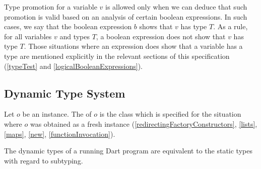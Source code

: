 \documentclass[makeidx]{article}
\begin{document}
{\LMHash{}%
Type promotion for a variable $v$ is allowed only when we can deduce that
such promotion is valid based on an analysis of certain boolean expressions.
In such cases, we say that
the boolean expression $b$ shows that $v$ has type $T$.
As a rule, for all variables $v$ and types $T$, a boolean expression
does not show that $v$ has type $T$.
Those situations where an expression does show that a variable has a type are
mentioned explicitly in the relevant sections of this specification
(\ref{typeTest} and \ref{logicalBooleanExpressions}).


\subsection{Dynamic Type System}


\LMHash{}%
Let $o$ be an instance.
The  of $o$ is the class which is specified
for the situation where $o$ was obtained as a fresh instance
(\ref{redirectingFactoryConstructors},
\ref{lists}, \ref{maps}, \ref{new}, \ref{functionInvocation}).


\LMHash{}%
The dynamic types of a running Dart program are equivalent to
the static types with regard to subtyping.


}
\end{document}
